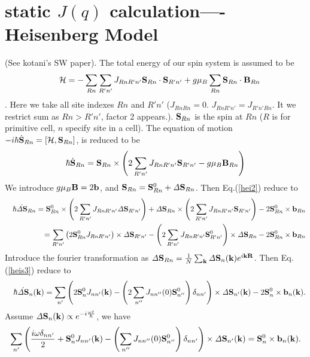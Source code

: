\documentclass[a4paper,10pt,epsf,fleqn]{article}
\newcommand{\bfk}{{\bf k}}
\newcommand{\bfR}{{\bf R}}
\newcommand{\ds}{\displaystyle}
\newcommand{\bfb}{{\bf b}}
\newcommand{\bfS}{{\bf S}}
\newcommand{\bfiS}{{\it \Delta \bf S}}
\newcommand{\bfB}{{\bf B}}
\newcommand{\req}[1]{Eq.(\ref{#1})}
\begin{document}
{{{\section{static $J(q)$ calculation---- Heisenberg Model}
(See kotani's SW paper).
The total energy of our spin system is assumed to be
\begin{eqnarray}
&& {\cal H} = - \sum_{Rn} \sum_{R'n'} 
J_{Rn R'n'} \bfS_{Rn} \cdot \bfS_{R'n'} + g \mu_B \sum_{Rn} 
\bfS_{Rn} \cdot \bfB_{Rn}
\label{hei1}
\end{eqnarray}
. Here we take all site indexes $Rn$ and $R'n'$ 
($J_{RnRn}=0$. $J_{RnR'n'}=J_{R'n'Rn}$. 
It we restrict sum as $Rn>R'n'$, factor 2 appears.).
$\bfS_{Rn}$ is the spin at $Rn$ ($R$ is for primitive cell, $n$ specify
site in a cell).
The equation of motion 
$-i\hbar \dot{\bfS}_{Rn} = [{\cal H} , {\bfS}_{Rn}]$,
is reduced to be
\begin{eqnarray}
\hbar \dot{\bfS}_{Rn} = \bfS_{Rn} \times 
\left(2 \sum_{R'n'} J_{Rn R'n'} \bfS_{R'n'} - g \mu_B \bfB_{Rn} \right)
\label{hei2}
\end{eqnarray}
We introduce $g \mu_B \bfB = 2 \bfb$, and $\bfS_{Rn}=\bfS_{Rn}^0 + 
\bfiS_{Rn}$. Then \req{hei2} reduce to
\begin{eqnarray}
&&\hbar \dot{\bfiS}_{Rn} =  \bfS^0_{Rn} \times
\left(2 \sum_{R'n'} J_{Rn R'n'} \bfiS_{R'n'}  \right)
+ \bfiS_{Rn} \times 
\left(2 \sum_{R'n'} J_{Rn R'n'} \bfS_{R'n'} \right)
- 2 \bfS^0_{Rn} \times \bfb_{Rn} \nonumber \\
&&= \sum_{R'n'} \left(2 \bfS^0_{Rn} J_{Rn R'n'} \right) \times \bfiS_{R'n'}
- 
\left(2 \sum_{R'n'} J_{Rn R'n'} \bfS^0_{R'n'} \right)  \times \bfiS_{Rn} 
- 2 \bfS^0_{Rn} \times \bfb_{Rn} 
\label{hei3}
\end{eqnarray}
Introduce the fourier transformation as
$\bfiS_{Rn} = \frac{1}{N} \sum_\bfk \bfiS_n(\bfk) e^{i \bfk \bfR}$.
Then \req{heis3} reduce to
\begin{eqnarray}
&&\hbar \dot{\bfiS}_{n}(\bfk)   
= \sum_{n'} \left( 2 \bfS^0_{n} J_{n n'}(\bfk) 
- \left(2 \sum_{n''} J_{n n''}(0) \bfS_{n''}^0\right) \delta_{nn'}\right)  \times \bfiS_{n'}(\bfk)
- 2 \bfS^0_{n} \times \bfb_{n}(\bfk).
\label{hei4}
\end{eqnarray}
Assume $\ds {\bfiS}_{n}(\bfk) \propto e^{-i \frac{\omega t}{\hbar}}$,
we have 
\begin{eqnarray}
 \sum_{n'} \left(\frac{i \omega \delta_{nn'}}{2} +  \bfS^0_{n} J_{n n'}(\bfk) 
- \left( \sum_{n''} J_{n n''}(0) \bfS_{n''}^0\right) \delta_{nn'}\right)  \times \bfiS_{n'}(\bfk)
= \bfS^0_{n} \times \bfb_{n}(\bfk).

\end{eqnarray}}}}
\end{document}
